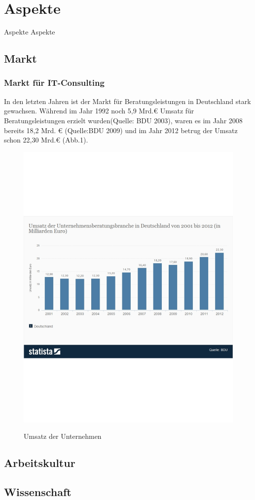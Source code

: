 \chapter{Aspekte}
Aspekte Aspekte
\section{Markt}
	\subsection{Markt für IT-Consulting}
	In den letzten Jahren ist der Markt für Beratungsleistungen in Deutschland stark gewachsen. Während im Jahr 1992 noch 5,9 Mrd.€ Umsatz für Beratungsleistungen erzielt wurden(Quelle: BDU 2003), waren es im Jahr 2008 bereits 18,2 Mrd. € (Quelle:BDU 2009) und im Jahr 2012 betrug der Umsatz schon 22,30 Mrd.€ (Abb.1).
	\begin{figure}[htp]
	\centering
	\includegraphics[width=0.5\linewidth]{./UmsatzUBeratungsbrancheDeutschland}
	\label{fig:UmsatzUBeratungsbrancheDeutschland}
	\caption{Umsatz der Unternehmen}
	\end{figure}
\section{Arbeitskultur}
\section{Wissenschaft}
